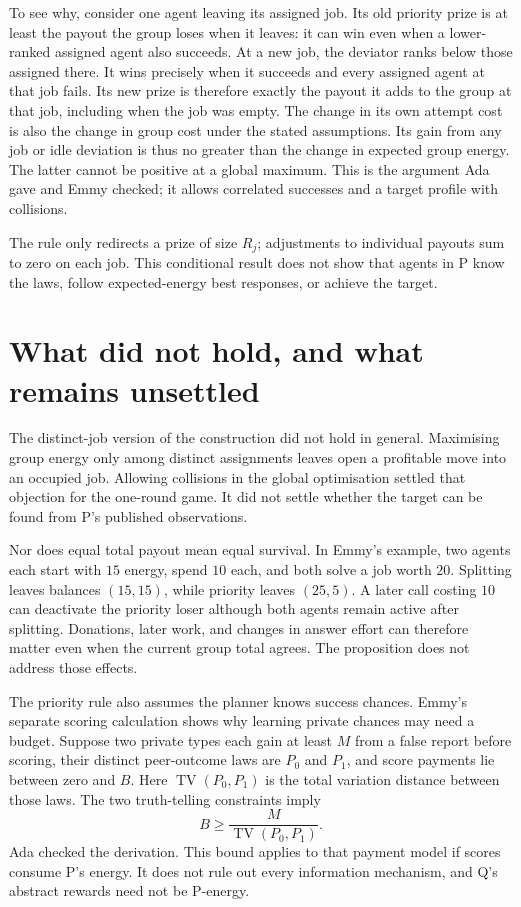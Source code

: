 \documentclass{article}
\begin{document}
To see why, consider one agent leaving its assigned job. Its old priority prize is at least the
payout the group loses when it leaves: it can win even when a lower-ranked assigned agent also
succeeds. At a new job, the deviator ranks below those assigned there. It wins precisely when it
succeeds and every assigned agent at that job fails. Its new prize is therefore exactly the payout
it adds to the group at that job, including when the job was empty. The change in its own attempt
cost is also the change in group cost under the stated assumptions. Its gain from any job or idle
deviation is thus no greater than the change in expected group energy. The latter cannot be positive
at a global maximum. This is the argument Ada gave and Emmy checked; it allows correlated successes
and a target profile with collisions.

The rule only redirects a prize of size \(R_j\); adjustments to individual payouts sum to zero on
each job. This conditional result does not show that agents in P know the laws, follow
expected-energy best responses, or achieve the target.

\section{What did not hold, and what remains unsettled}

The distinct-job version of the construction did not hold in general. Maximising group energy only
among distinct assignments leaves open a profitable move into an occupied job. Allowing collisions
in the global optimisation settled that objection for the one-round game. It did not settle whether
the target can be found from P's published observations.

Nor does equal total payout mean equal survival. In Emmy's example, two agents each start with
\(15\) energy, spend \(10\) each, and both solve a job worth \(20\). Splitting leaves balances
\((15,15)\), while priority leaves \((25,5)\). A later call costing \(10\) can deactivate the
priority loser although both agents remain active after splitting. Donations, later work, and
changes in answer effort can therefore matter even when the current group total agrees. The
proposition does not address those effects.

The priority rule also assumes the planner knows success chances. Emmy's separate scoring
calculation shows why learning private chances may need a budget. Suppose two private types each
gain at least \(M\) from a false report before scoring, their distinct peer-outcome laws are \(P_0\)
and \(P_1\), and score payments lie between zero and \(B\). Here \(\operatorname{TV}(P_0,P_1)\) is
the total variation distance between those laws. The two truth-telling constraints imply
\[
B\geq \frac{M}{\operatorname{TV}(P_0,P_1)}.
\]
Ada checked the derivation. This bound applies to that payment model if scores consume P's energy.
It does not rule out every information mechanism, and Q's abstract rewards need not be P-energy.
\end{document}
